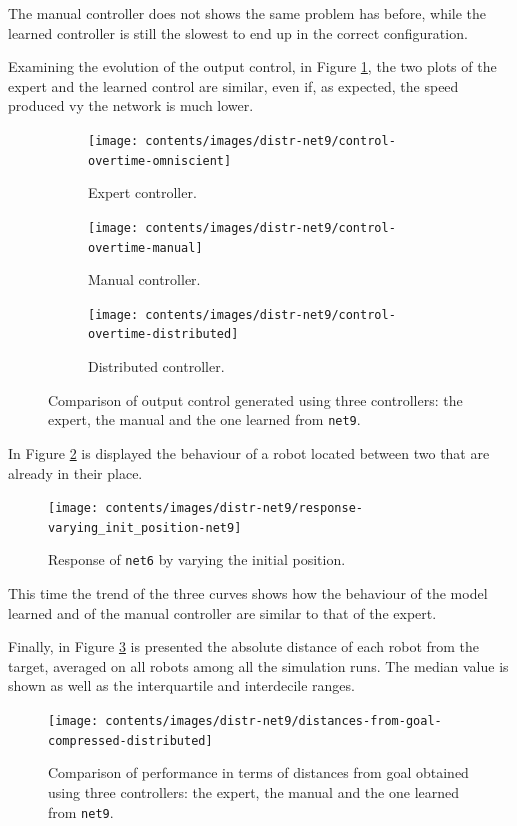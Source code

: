 \noindent
The manual controller does not shows the same problem has before, while the 
learned controller is still the slowest to end up in the correct configuration.

Examining the evolution of the output control, in Figure \ref{fig:net9control}, 
the two plots of the expert and the learned control are similar, even if, as 
expected, the speed produced vy the network is much lower.
\begin{figure}[!htb]
	\centering
	\begin{subfigure}[h]{0.3\textwidth}
		\centering
		\texttt{[image: contents/images/distr-net9/control-overtime-omniscient]}%
		\caption{Expert controller.}
	\end{subfigure}
	\hfill
	\begin{subfigure}[h]{0.3\textwidth}
		\centering
		\texttt{[image: contents/images/distr-net9/control-overtime-manual]}%
		\caption{Manual controller.}
	\end{subfigure}
	\hfill
	\begin{subfigure}[h]{0.3\textwidth}
		\centering
		\texttt{[image: contents/images/distr-net9/control-overtime-distributed]}
		\caption{Distributed controller.}
	\end{subfigure}
	\caption[Evaluation of the control learned by \texttt{net9}.]{Comparison 
		of output control generated using three controllers: the expert, the manual 
		and the one learned from \texttt{net9}.}
	\label{fig:net9control}
\end{figure}

In Figure \ref{fig:net9responseposition} is displayed the behaviour of a robot 
located between two that are already in their place.
\begin{figure}[!htb]
	\centering
\texttt{[image: contents/images/distr-net9/response-varying\_init\_position-net9]}%
	\caption{Response of \texttt{net6} by varying the initial position.}
	\label{fig:net9responseposition}
\end{figure}
This time the trend of the three curves shows how the behaviour of the model 
learned and of the manual controller are similar to that of the expert.

Finally, in Figure \ref{fig:net9distance} is presented the absolute distance of each 
robot from the target, averaged on all robots among all the simulation runs. The 
median value is shown as well as the interquartile and interdecile ranges.
\begin{figure}[!htb]
	\centering
	\texttt{[image: contents/images/distr-net9/distances-from-goal-compressed-distributed]}%
	\caption[Evaluation of \texttt{net9} distances from goal.]{Comparison of 
		performance in terms of distances from goal obtained using three 
		controllers: the expert, the manual and the one learned from \texttt{net9}.}
	\label{fig:net9distance}
\end{figure}

